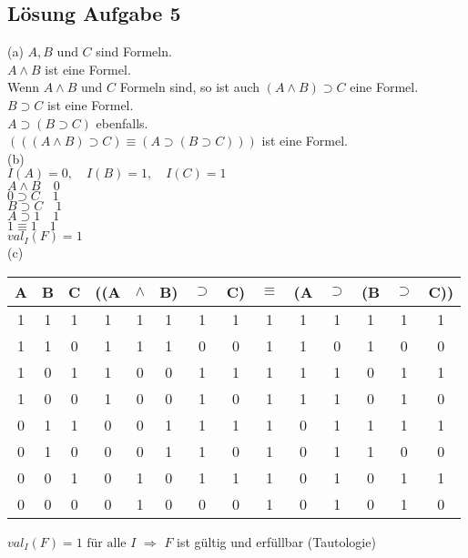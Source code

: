 \documentclass[a4paper, margins=3cm]{homework}
\begin{document}
\newpage

\subsection*{Lösung Aufgabe 5}
(a)
$A, B \text{ und } C$ sind Formeln. \\
$A \wedge B$ ist eine Formel. \\
Wenn $A\wedge B$ und $C$ Formeln sind, so ist auch $(A\wedge B) \supset C$ eine Formel.\\
$B \supset C$ ist eine Formel. \\
$A \supset (B \supset C)$ ebenfalls. \\
$(((A \wedge B) \supset C) \equiv (A \supset (B \supset C)))$ ist eine Formel. \\

(b) \\
$I(A) = 0,\quad I(B)=1,\quad I(C)=1$ \\
$A \wedge B\quad 0$ \\
$0 \supset C \quad 1$ \\
$B \supset C \quad 1$ \\
$A \supset 1 \quad 1$ \\
$1 \equiv 1 \quad 1$ \\
$val_I(F)=1$ \\

(c)
\begin{center}
	\begin{tabular}{ccc|ccccc|c|ccccc}
	A & B & C & ((A & $\wedge$ & B) & $\supset$ & C) & $\equiv$ & (A & $\supset$ & (B & $\supset$ & C)) \\ \hline
	1 & 1 & 1 & 1   & 1        & 1  & 1         & 1  & 1        & 1  & 1         & 1  & 1         & 1   \\
	1 & 1 & 0 & 1   & 1        & 1  & 0         & 0  & 1        & 1  & 0         & 1  & 0         & 0   \\
	1 & 0 & 1 & 1   & 0        & 0  & 1         & 1  & 1        & 1  & 1         & 0  & 1         & 1   \\
	1 & 0 & 0 & 1   & 0        & 0  & 1         & 0  & 1        & 1  & 1         & 0  & 1         & 0   \\
	0 & 1 & 1 & 0   & 0        & 1  & 1         & 1  & 1        & 0  & 1         & 1  & 1         & 1   \\
	0 & 1 & 0 & 0   & 0        & 1  & 1         & 0  & 1        & 0  & 1         & 1  & 0         & 0   \\
	0 & 0 & 1 & 0   & 1        & 0  & 1         & 1  & 1        & 0  & 1         & 0  & 1         & 1   \\
	0 & 0 & 0 & 0   & 1        & 0  & 0         & 0  & 1        & 0  & 1         & 0  & 1         & 0  
	\end{tabular}
	$val_I(F)=1 \text{ für alle } I$
	$\Rightarrow$ $F$ ist gültig und erfüllbar (Tautologie)
\end{center}
\end{document}
